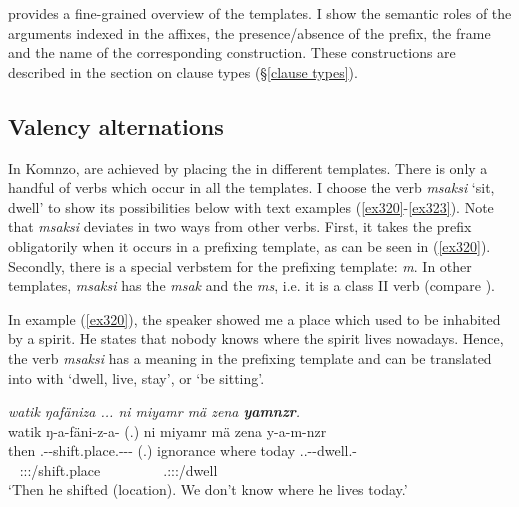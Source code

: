  provides a fine-grained overview of the templates. I show the semantic roles of the arguments indexed in the affixes, the presence/absence of the  prefix, the  frame and the name of the corresponding construction. These constructions are described in the section on clause types (\S\ref{clause types}).

\subsection{Valency alternations} \label{valencyalternations}

In Komnzo,  are achieved by placing the  in different templates. There is only a handful of verbs which occur in all the templates. I choose the verb \emph{msaksi} `sit, dwell' to show its possibilities below with text examples (\ref{ex320}-\ref{ex323}). Note that \emph{msaksi} deviates in two ways from other verbs. First, it takes the  prefix obligatorily when it occurs in a prefixing template, as can be seen in (\ref{ex320}). Secondly, there is a special verbstem for the prefixing template: \emph{m}. In other templates, \emph{msaksi} has the  \emph{msak} and the  \emph{ms}, i.e. it is a class II verb (compare ).%

In example (\ref{ex320}), the speaker showed me a place which used to be inhabited by a spirit. He states that nobody knows where the spirit lives nowadays. Hence, the verb \emph{msaksi} has a  meaning in the prefixing template and can be translated into  with `dwell, live, stay', or `be sitting'.

\begin{exe}
	\ex \emph{watik ŋafäniza ... ni miyamr mä zena \textbf{yamnzr}.}\\
	\glll watik ŋ-a-fäni-z-a-\Zero{} (.) ni miyamr mä zena{\fixgll} y-a-m-nzr\\
	then \M.\Alph{}-\Vc-shift.place.\Ext-\Ndu-\Pst-\Stsg{} (.) \Fnsg{} ignorance where today \Tsg.\Masc.\Alph-\Vc-dwell.\Ext-\Ndu\\
	~ {\Stsg:\Sbj:\Ipfv:\Pst/shift.place} ~ ~ ~ ~ ~ {\Tsg.\Masc:\Sbj:\Nonpast:\Ipfv/dwell}\\
	\trans `Then he shifted (location). We don't know where he lives today.'\\ 
	\label{ex320}
\end{exe}

